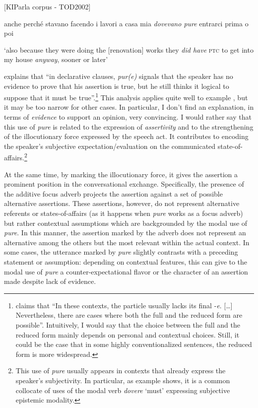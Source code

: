 \ea%
    \label{ex:key:31}

          [KIParla corpus - TOD2002]

anche perché stavano facendo i lavori a casa mia \textit{dovevano pure} entrarci prima o poi

\glt ‘also because they were doing the [renovation] works they \textit{did have} \textsc{ptc} to get into my house \textit{anyway}, sooner or later’
    \z

\citet[115]{Coniglio2008} explains that “in declarative clauses, \textit{pur(e)} signals that the speaker has no evidence to prove that his assertion is true, but he still thinks it logical to suppose that it must be true”.\footnote{\citet[114]{Coniglio2008} claims that “In these contexts, the particle usually lacks its final -\textit{e}. […] Nevertheless, there are cases where both the full and the reduced form are possible”. Intuitively, I would say that the choice between the full and the reduced form mainly depends on personal and contextual choices. Still, it could be the case that in some highly conventionalized sentences, the reduced form is more widespread.} This analysis applies quite well to example , but it may be too narrow for other cases. In particular, I don’t find an explanation, in terms of \textit{evidence} to support an opinion, very convincing. I would rather say that this use of \textit{pure} is related to the expression of \textit{assertivity} and to the strengthening of the illocutionary force expressed by the speech act. It contributes to encoding the speaker’s subjective expectation/evaluation on the communicated state-of-affairs.\footnote{This use of \textit{pure} usually appears in contexts that already express the speaker’s subjectivity. In particular, as example  shows, it is a common collocate of uses of the modal verb \textit{dovere} ‘must’ expressing subjective epistemic modality.}

At the same time, by marking the illocutionary force, it gives the assertion a prominent position in the conversational exchange. Specifically, the presence of the additive focus adverb projects the assertion against a set of possible alternative assertions. These assertions, however, do not represent alternative referents or states-of-affairs (as it happens when \textit{pure} works as a focus adverb) but rather contextual assumptions which are backgrounded by the modal use of \textit{pure}. In this manner, the assertion marked by the adverb does not represent an alternative among the others but the most relevant within the actual context. In some cases, the utterance marked by \textit{pure} slightly contrasts with a preceding statement or assumption: depending on contextual features, this can give to the modal use of \textit{pure} a counter-expectational flavor or the character of an assertion made despite lack of evidence.

